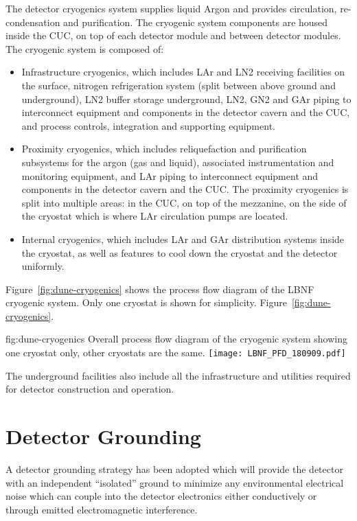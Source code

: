 The detector cryogenics system supplies liquid Argon and provides
circulation, re-condensation and purification. The cryogenic system
components are housed inside the CUC, on top of each detector module
and between detector modules. The cryogenic system is composed of:
\begin{itemize}
\item Infrastructure cryogenics, which includes LAr and LN2 receiving
  facilities on the surface, nitrogen refrigeration system (split
  between above ground and underground), LN2 buffer storage
  underground, LN2, GN2 and GAr piping to interconnect equipment and
  components in the detector cavern and the CUC, and process controls,
  integration and supporting equipment.
\item Proximity cryogenics, which includes reliquefaction and
  purification subsystems for the argon (gas and liquid), associated
  instrumentation and monitoring equipment, and LAr piping to
  interconnect equipment and components in the detector cavern and the
  CUC. The proximity cryogenics is split into multiple areas: in the
  CUC, on top of the mezzanine, on the side of the cryostat which is
  where LAr circulation pumps are located.
\item Internal cryogenics, which includes LAr and GAr distribution
  systems inside the cryostat, as well as features to cool down the
  cryostat and the detector uniformly.
\end{itemize}
Figure~\ref{fig:dune-cryogenics} shows the process flow diagram of the
LBNF cryogenic system. Only one cryostat is shown for simplicity.
Figure~\ref{fig:dune-cryogenics}.
\begin{dunefigure}{fig:dune-cryogenics}
  {Overall process flow diagram of the cryogenic system showing one
    cryostat only, other cryostats are the same.}
  \texttt{[image: LBNF\_PFD\_180909.pdf]}
\end{dunefigure}


The underground facilities also include all the infrastructure and
utilities required for detector construction and operation.

\section{Detector Grounding}
\label{sec:fdsp-coord-faci-grounding}

A detector grounding strategy has been adopted which will provide the
detector with an independent ``isolated'' ground to minimize any
environmental electrical noise which can couple into the detector
electronics either conductively or through emitted electromagnetic
interference.

